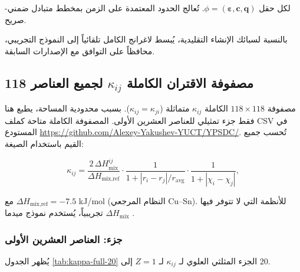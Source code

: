 \documentclass[11pt,a4paper]{article}
\begin{document}
\begin{otherlanguage}{arabic}
		لكل حقل \(\phi = (\boldsymbol{\varepsilon}, \mathbf{c}, \mathbf{q})\). تُعالج الحدود المعتمدة على الزمن بمخطط متبادل ضمني-صريح.
		
		بالنسبة لسبائك الإنشاء التقليدية، يُبسط لاغرانج الكامل تلقائياً إلى النموذج التجريبي، محافظاً على التوافق مع الإصدارات السابقة.
		
		\subsection{مصفوفة الاقتران الكاملة \(\kappa_{ij}\) لجميع العناصر 118}
		\label{subsec:full-kappa}
		
		مصفوفة \(118\times118\) الكاملة \(\kappa_{ij}\) متماثلة (\(\kappa_{ij}=\kappa_{ji}\)). بسبب محدودية المساحة، يطبع هنا فقط جزء تمثيلي للعناصر العشرين الأولى. المصفوفة الكاملة متاحة كملف CSV في المستودع \url{https://github.com/Alexey-Yakushev-YUCT/YPSDC/}. تُحسب جميع القيم باستخدام الصيغة:
		
		\[
		\kappa_{ij} = \frac{2\,\Delta H_{\text{mix}}^{ij}}{\Delta H_{\text{mix,ref}}} \cdot
		\frac{1}{1 + |r_i - r_j|/r_{\text{avg}}} \cdot
		\frac{1}{1 + |\chi_i - \chi_j|},
		\]
		
		مع \(\Delta H_{\text{mix,ref}} = -7.5\) kJ/mol (النظام المرجعي Cu–Sn). للأنظمة التي لا تتوفر فيها \(\Delta H_{\text{mix}}\) تجريبياً، يُستخدم نموذج ميدما \cite{Miedema1980}.
		
		\subsubsection*{جزء: العناصر العشرين الأولى}
		يُظهر الجدول \ref{tab:kappa-full-20} الجزء المثلثي العلوي لـ \(\kappa_{ij}\) لـ \(Z=1\) إلى \(20\).
		

\end{otherlanguage}
\end{document}
